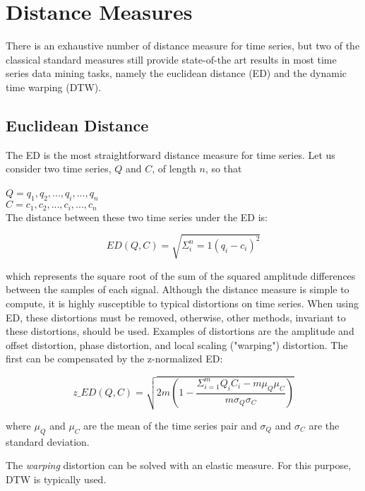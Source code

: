 \section{Distance Measures}
\label{sec:distance}

There is an exhaustive number of distance measure for time series, but two of the classical standard measures still provide state-of-the art results in most time series data mining tasks, namely the euclidean distance (ED) and the dynamic time warping (DTW).
\par

\subsection{Euclidean Distance}
\label{subsec:ed}

The ED is the most straightforward distance measure for time series. Let us consider two time series, $Q$ and $C$, of length $n$, so that\\
\\
$Q = q_1, q_2, ..., q_i, ..., q_n$\\
$C = c_1, c_2, ..., c_i, ..., c_n$\\

The distance between these two time series under the ED is:

\begin{equation}
ED(Q,C) = \sqrt{\Sigma^n_i=1 (q_i - c_i)^2}
\end{equation}

which represents the square root of the sum of the squared amplitude differences between the samples of each signal. Although the distance measure is simple to compute, it is highly susceptible to typical distortions on time series. When using ED, these distortions must be removed, otherwise, other methods, invariant to these distortions, should be used. Examples of distortions are the amplitude and offset distortion, phase distortion, and local scaling ("warping") distortion. The first can be compensated by the z-normalized ED:

\begin{equation}
z\_ED(Q,C) = \sqrt{2m(1-\frac{\Sigma^m_{i=1}Q_iC_i - m\mu_Q\mu_C}{m\sigma_Q\sigma_C})}
\end{equation}

where $\mu_Q$ and $\mu_C$ are the mean of the time series pair and $\sigma_Q$ and $\sigma_C$ are the standard deviation.

The \textit{warping} distortion can be solved with an elastic measure. For this purpose, DTW is typically used.

